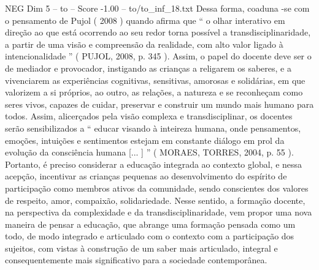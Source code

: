 \begin{textsample}{NEG Dim 5 – to – Score -1.00 – to/to\_inf\_18.txt}
Dessa forma, coaduna -se com o pensamento de Pujol ( 2008 ) quando afirma que “ o olhar interativo em direção ao que está ocorrendo ao seu redor torna possível a transdisciplinaridade, a partir de uma visão e compreensão da realidade, com alto valor ligado à intencionalidade ” ( PUJOL, 2008, p. 345 ).
Assim, o papel do docente deve ser o de mediador e provocador, instigando as crianças a religarem os saberes, e a vivenciarem as experiências cognitivas, sensitivas, amorosas e solidárias, em que valorizem a si próprios, ao outro, as relações, a natureza e se reconheçam como seres vivos, capazes de cuidar, preservar e construir um mundo mais humano para todos.
Assim, alicerçados pela visão complexa e transdisciplinar, os docentes serão sensibilizados a “ educar visando à inteireza humana, onde pensamentos, emoções, intuições e sentimentos estejam em constante diálogo em prol da evolução da consciência humana [... ] ” ( MORAES, TORRES, 2004, p. 55 ).
Portanto, é preciso considerar a educação integrada ao contexto global, e nessa acepção, incentivar as crianças pequenas ao desenvolvimento do espírito de participação como membros ativos da comunidade, sendo conscientes dos valores de respeito, amor, compaixão, solidariedade.
Nesse sentido, a formação docente, na perspectiva da complexidade e da transdisciplinaridade, vem propor uma nova maneira de pensar a educação, que abrange uma formação pensada como um todo, de modo integrado e articulado com o contexto com a participação dos sujeitos, com vistas à construção de um saber mais articulado, integral e consequentemente mais significativo para a sociedade contemporânea.

\end{textsample}
